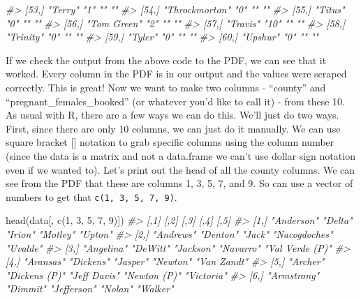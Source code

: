 \documentclass[
  12pt,
]{book}
\newenvironment{Shaded}{\begin{snugshade}}{\end{snugshade}}
\newcommand{\CommentTok}[1]{\textcolor[rgb]{0.37,0.37,0.37}{\textit{#1}}}
\newcommand{\DecValTok}[1]{\textcolor[rgb]{0.06,0.06,0.06}{#1}}
\newcommand{\FunctionTok}[1]{\textcolor[rgb]{0,0,0}{#1}}
\newcommand{\NormalTok}[1]{#1}
\begin{document}
\begin{Shaded}
\begin{Highlighting}[]
\CommentTok{\#\textgreater{} [53,] "Terry"         "1"  ""              ""   }
\CommentTok{\#\textgreater{} [54,] "Throckmorton"  "0"  ""              ""   }
\CommentTok{\#\textgreater{} [55,] "Titus"         "0"  ""              ""   }
\CommentTok{\#\textgreater{} [56,] "Tom Green"     "2"  ""              ""   }
\CommentTok{\#\textgreater{} [57,] "Travis"        "10" ""              ""   }
\CommentTok{\#\textgreater{} [58,] "Trinity"       "0"  ""              ""   }
\CommentTok{\#\textgreater{} [59,] "Tyler"         "0"  ""              ""   }
\CommentTok{\#\textgreater{} [60,] "Upshur"        "0"  ""              ""}
\end{Highlighting}
\end{Shaded}

If we check the output from the above code to the PDF, we can see that it worked. Every column in the PDF is in our output and the values were scraped correctly. This is great! Now we want to make two columns - ``county'' and ``pregnant\_females\_booked'' (or whatever you'd like to call it) - from these 10. As usual with R, there are a few ways we can do this. We'll just do two ways. First, since there are only 10 columns, we can just do it manually. We can use square bracket {[}{]} notation to grab specific columns using the column number (since the data is a matrix and not a data.frame we can't use dollar sign notation even if we wanted to). Let's print out the head of all the county columns. We can see from the PDF that these are columns 1, 3, 5, 7, and 9. So can use a vector of numbers to get that \texttt{c(1,\ 3,\ 5,\ 7,\ 9)}.

\begin{Shaded}
\begin{Highlighting}[]
\FunctionTok{head}\NormalTok{(data[, }\FunctionTok{c}\NormalTok{(}\DecValTok{1}\NormalTok{, }\DecValTok{3}\NormalTok{, }\DecValTok{5}\NormalTok{, }\DecValTok{7}\NormalTok{, }\DecValTok{9}\NormalTok{)])}
\CommentTok{\#\textgreater{}      [,1]        [,2]          [,3]         [,4]          [,5]           }
\CommentTok{\#\textgreater{} [1,] "Anderson"  "Delta"       "Irion"      "Motley"      "Upton"        }
\CommentTok{\#\textgreater{} [2,] "Andrews"   "Denton"      "Jack"       "Nacogdoches" "Uvalde"       }
\CommentTok{\#\textgreater{} [3,] "Angelina"  "DeWitt"      "Jackson"    "Navarro"     "Val Verde (P)"}
\CommentTok{\#\textgreater{} [4,] "Aransas"   "Dickens"     "Jasper"     "Newton"      "Van Zandt"    }
\CommentTok{\#\textgreater{} [5,] "Archer"    "Dickens (P)" "Jeff Davis" "Newton (P)"  "Victoria"     }
\CommentTok{\#\textgreater{} [6,] "Armstrong" "Dimmit"      "Jefferson"  "Nolan"       "Walker"}
\end{Highlighting}
\end{Shaded}
\end{document}

